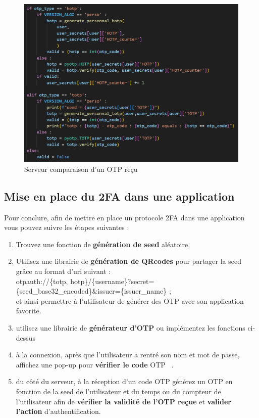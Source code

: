 \documentclass[a4paper, 10pt]{article}
\newcommand{\otp}{\textsc{OTP} }
\begin{document}
\begin{figure}[H]
        \centering
        \includegraphics[scale=0.7]{img/C_proto/code/code_val_otp.png}
        \caption{Serveur comparaison d'un \otp reçu}
        \label{fig:code-val}
\end{figure}


\newpage
    \subsection{Mise en place du 2FA dans une application}

    Pour conclure, afin de \textcolor{myblue}{mettre en place un protocole 2FA} dans une application vous pouvez suivre les étapes suivantes :
\begin{enumerate}
    \item Trouvez une fonction de \textbf{génération de seed} aléatoire,
    \item Utilisez une librairie de \textbf{génération de QRcodes} pour partager la seed grâce au format d'uri suivant : \\
            \textcolor{mygreen}{otpauth://\{totp, hotp\}/\{username\}?secret=\{seed\_base32\_encoded\}\&issuer=\{issuer\_name\}} ;\\
            et ainsi permettre à l'utilisateur de générer des \otp avec son application favorite.
    \item utilisez une librairie de \textbf{générateur d'\otp} ou implémentez les fonctions ci-dessus
    \item à la connexion, après que l'utilisateur a rentré son nom et mot de passe, affichez une pop-up pour \textbf{vérifier le code} \otp\ .
    \item du côté du serveur, à la réception d'un code \otp générez un \otp en fonction de la seed de l'utilisateur et du temps ou du compteur de l'utilisateur afin de \textbf{vérifier la validité de l'\otp reçue} et \textbf{valider l'action} d'authentification.
\end{enumerate}
\end{document}
